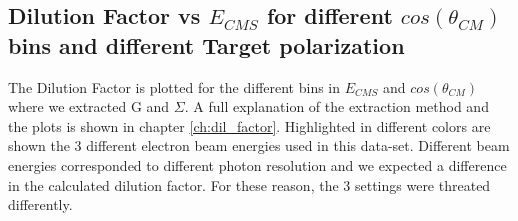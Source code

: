 \begin{figure}[htb]
\ContinuedFloat
  \begin{center} 
  \end{center}
\end{figure}


\clearpage
\newpage

\subsection{Dilution Factor vs \texorpdfstring{$E_{CMS}$}{E-CMS} for different \texorpdfstring{$cos(\theta_{CM})$}{cos(theta-CM)} bins and different Target polarization}
\label{app:dilfactor}
The Dilution Factor is plotted  for the different bins in $E_{CMS}$ and $cos(\theta_{CM})$ where we extracted G and $\Sigma$. A full explanation of the extraction method and the plots is shown in chapter \ref{ch:dil_factor}. Highlighted in different colors are shown the 3 different electron beam energies used in this data-set. Different beam energies corresponded to different photon resolution and we expected a difference in the calculated dilution factor. For these reason, the 3 settings were threated differently. 
\begin{figure}[htb]
  \begin{center}
     \\
  \end{center}
\end{figure}
